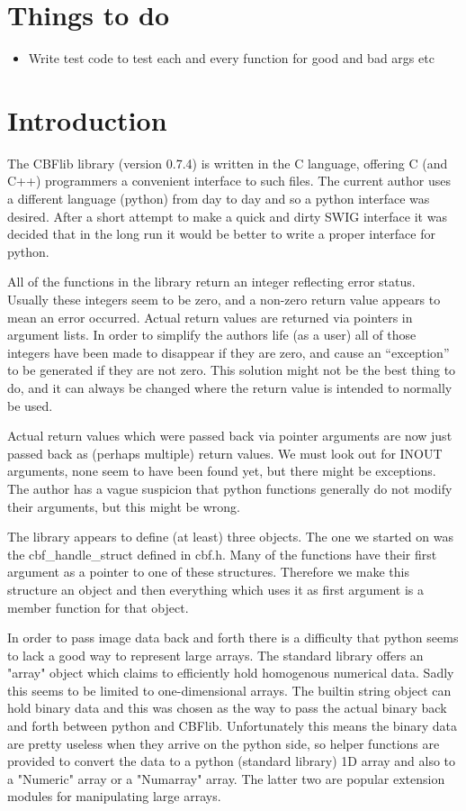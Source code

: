 \documentclass[10pt,a4paper,twoside,notitlepage]{article}
\begin{document}
\section*{Things to do}

\begin{itemize}
\item Write test code to test each and every function for good and bad args etc
\end{itemize}
\section{Introduction}

The CBFlib library (version 0.7.4) is written in the C language, offering C
 (and C++)
programmers a convenient interface to such files.
The current author uses a different language (python) from day to day and 
so a python interface was desired. 
After a short attempt to make a quick and dirty SWIG interface it was decided
that in the long run it would be better to write a proper interface for python.

All of the functions in the library return an integer reflecting error status.
Usually these integers seem to be zero, and a non-zero return value appears
to mean an error occurred.
Actual return values are returned via pointers in argument lists.
In order to simplify the authors life (as a user) all of those integers have
been made to disappear if they are zero, and cause an ``exception'' to 
be generated if they are not zero. 
This solution might not be the best thing to do, and it can always be changed 
where the return value is intended to normally be used.

Actual return values which were passed back via pointer arguments are now
just passed back as (perhaps multiple) return values.
We must look out for INOUT arguments, none seem to have been found yet, but there 
might be exceptions.
The author has a vague suspicion that python functions generally do not modify their
arguments, but this might be wrong.

The library appears to define (at least) three objects. The one we started on
was the cbf\_handle\_struct defined in cbf.h. 
Many of the functions have their first argument as a pointer to one
of these structures. Therefore we make this structure an object and then 
everything which uses it as first argument is a member function for that
object.

In order to pass image data back and forth there is a difficulty that python
seems to lack a good way to represent large arrays.
The standard library offers an "array" object which claims to efficiently
hold homogenous numerical data. 
Sadly this seems to be limited to one-dimensional arrays.
The builtin string object can hold binary data and this was chosen as 
the way to pass the actual binary back and forth between python and CBFlib.
Unfortunately this means the binary data are pretty useless when they arrive
on the python side, so helper functions are provided to convert the data
to a python (standard library) 1D array and also to a "Numeric" array or a
"Numarray" array. 
The latter two are popular extension modules for manipulating large arrays.
\end{document}
